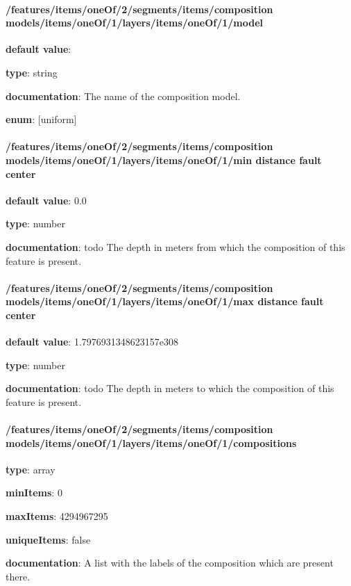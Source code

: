 \paragraph{/features/items/oneOf/2/segments/items/composition models/items/oneOf/1/layers/items/oneOf/1/model} \begin{itemized}
\item {\bf default value}: 
\item {\bf type}: string
\item {\bf documentation}: The name of the composition model.
\item {\bf enum}: [uniform]\end{itemized}\paragraph{/features/items/oneOf/2/segments/items/composition models/items/oneOf/1/layers/items/oneOf/1/min distance fault center} \begin{itemized}
\item {\bf default value}: 0.0
\item {\bf type}: number
\item {\bf documentation}: todo The depth in meters from which the composition of this feature is present.
\end{itemized}\paragraph{/features/items/oneOf/2/segments/items/composition models/items/oneOf/1/layers/items/oneOf/1/max distance fault center} \begin{itemized}
\item {\bf default value}: 1.7976931348623157e308
\item {\bf type}: number
\item {\bf documentation}: todo The depth in meters to which the composition of this feature is present.
\end{itemized}\paragraph{/features/items/oneOf/2/segments/items/composition models/items/oneOf/1/layers/items/oneOf/1/compositions} \begin{itemized}
\item {\bf type}: array
\item {\bf minItems}: 0
\item {\bf maxItems}: 4294967295
\item {\bf uniqueItems}: false
\item {\bf documentation}: A list with the labels of the composition which are present there.

\end{itemized}
